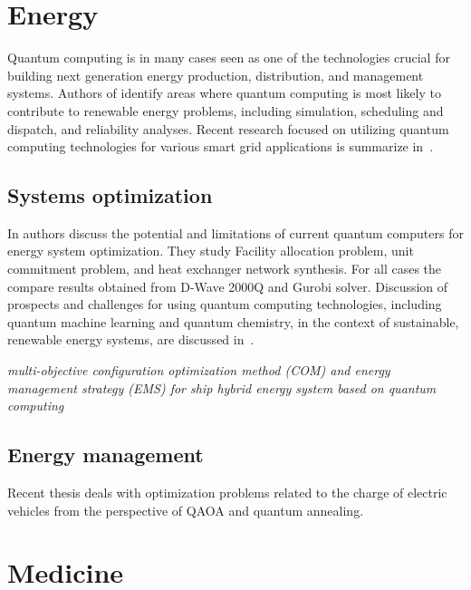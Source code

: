 \documentclass[a4paper,11pt]{article}
\begin{document}
\section{Energy}

Quantum computing is in many cases seen as one of the technologies crucial for building next generation energy production, distribution, and management systems. Authors of \cite{giani2021quantum} identify areas where quantum computing is most likely to contribute to renewable energy problems, including simulation, scheduling and dispatch, and reliability analyses. Recent research focused on utilizing quantum computing technologies for various smart grid applications is summarize in~\cite{ullah2022quantum}.


\subsection{Systems optimization}

In \cite{ajagekar2019quantum} authors discuss the potential and limitations of current quantum computers for energy system optimization. They study 
Facility allocation problem, unit commitment problem, and heat exchanger network synthesis. For all cases the compare results obtained from D-Wave 2000Q and Gurobi solver.
Discussion of prospects and challenges for using quantum computing technologies, including quantum machine learning and quantum chemistry, in the context of sustainable, renewable energy systems, are discussed in~\cite{ajagekar2022quantum}.

\emph{multi-objective configuration optimization method (COM) and energy management strategy (EMS) for ship hybrid energy system based on quantum computing} \cite{si2022configuration}


\subsection{Energy management}

Recent thesis \cite{veshchezerova2022quantum} deals with optimization problems related to the charge of electric vehicles from the perspective of QAOA and quantum annealing.



\section{Medicine}
%
\end{document}
